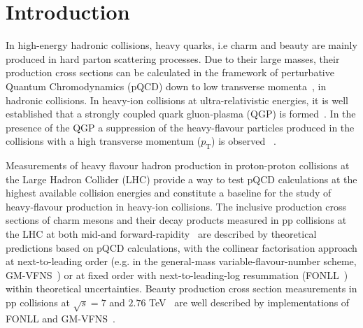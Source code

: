\section{Introduction}\label{section:introduction}
In high-energy hadronic collisions, heavy quarks, i.e charm and beauty are mainly produced in hard parton scattering processes. Due to their large masses, their production cross sections can be calculated in the framework of perturbative Quantum Chromodynamics (pQCD) down to low transverse momenta~\cite{Kniehl:2008zza,Cacciari:2003uh,Kniehl:2005mk,Cacciari:2003zu}, %
in hadronic collisions. In heavy-ion collisions at ultra-relativistic energies, it is well established that a strongly coupled quark gluon-plasma (QGP) is formed~\cite{Karsch:2006xs,Borsanyi:2010cj,Bazavov:2011nk}. In the presence of the QGP a suppression of the heavy-flavour particles produced in the collisions with a high transverse momentum ($p_{\textrm{T}}$) is observed ~\cite{ALICE:2012ab,Abelev:2012qh,Adam:2015nna,Adam:2016khe,Sirunyan:2017xss, Acharya:2020lgn}. 

Measurements of heavy flavour hadron production in proton-proton collisions at the Large Hadron Collider (LHC) provide a way to test pQCD calculations at the highest available collision energies and constitute a baseline for the study of heavy-flavour production in heavy-ion collisions. The inclusive production cross sections of charm mesons and their decay products measured in pp collisions at the LHC at both mid-and forward-rapidity~\cite{Abelev:2012pi,Abelev:2012vra,Abelev:2012xe,Aaij:2016jht} are described by theoretical predictions based on pQCD calculations, with the collinear factorisation approach at next-to-leading order (e.g. in the general-mass variable-flavour-number scheme, GM-VFNS~\cite{Kniehl:2008eu,Kniehl:2011bk}) or at fixed order with next-to-leading-log resummation (FONLL~\cite{Cacciari:2012ny}) within theoretical uncertainties.
Beauty production cross section measurements in pp collisions at $\sqrt{s}=7$ and $2.76$ TeV~\cite{Abelev:2012gx,Adam:2016wyz,ATLAS:2013cia,Khachatryan:2010yr,Aaij:2010gn}  are well described by implementations of FONLL and GM-VFNS~\cite{Cacciari:2012ny,Kniehl:2005ej,Maciula:2013wg,Abelev:2012gx,Abelev:2012sca,ATLAS:2013cia,Khachatryan:2010yr,Aaij:2010gn,Kniehl:2011bk}. 

